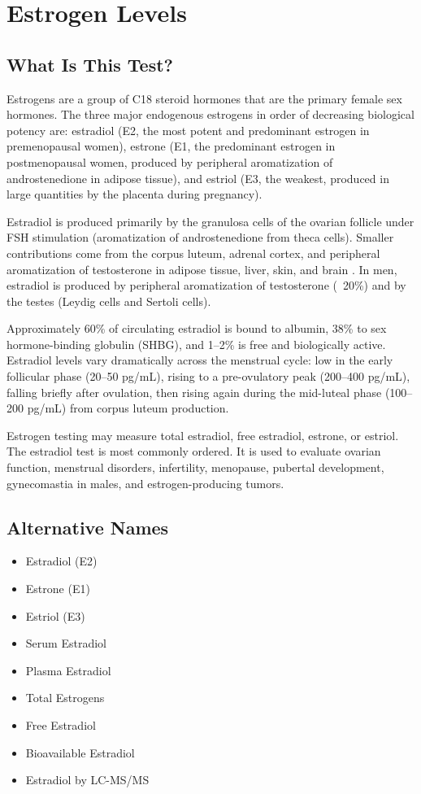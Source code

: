 \chapter{Estrogen Levels}

\section*{What Is This Test?}
Estrogens are a group of C18 steroid hormones that are the primary female sex hormones. The three major endogenous estrogens in order of decreasing biological potency are: estradiol (E2, the most potent and predominant estrogen in premenopausal women), estrone (E1, the predominant estrogen in postmenopausal women, produced by peripheral aromatization of androstenedione in adipose tissue), and estriol (E3, the weakest, produced in large quantities by the placenta during pregnancy).

Estradiol is produced primarily by the granulosa cells of the ovarian follicle under FSH stimulation (aromatization of androstenedione from theca cells). Smaller contributions come from the corpus luteum, adrenal cortex, and peripheral aromatization of testosterone in adipose tissue, liver, skin, and brain \cite{nelson2001estrogen}. In men, estradiol is produced by peripheral aromatization of testosterone (~20\%) and by the testes (Leydig cells and Sertoli cells).

Approximately 60\% of circulating estradiol is bound to albumin, 38\% to sex hormone-binding globulin (SHBG), and 1--2\% is free and biologically active. Estradiol levels vary dramatically across the menstrual cycle: low in the early follicular phase (20--50 pg/mL), rising to a pre-ovulatory peak (200--400 pg/mL), falling briefly after ovulation, then rising again during the mid-luteal phase (100--200 pg/mL) from corpus luteum production.

Estrogen testing may measure total estradiol, free estradiol, estrone, or estriol. The estradiol test is most commonly ordered. It is used to evaluate ovarian function, menstrual disorders, infertility, menopause, pubertal development, gynecomastia in males, and estrogen-producing tumors.

\section*{Alternative Names}
\begin{itemize}
  \item Estradiol (E2)
  \item Estrone (E1)
  \item Estriol (E3)
  \item Serum Estradiol
  \item Plasma Estradiol
  \item Total Estrogens
  \item Free Estradiol
  \item Bioavailable Estradiol
  \item Estradiol by LC-MS/MS
\end{itemize}
